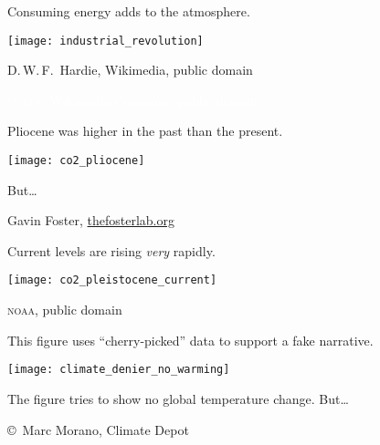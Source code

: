 \documentclass[t]{beamer}
\begin{document}
%
%

%
%
%
%
\begin{frame}[t]{Consuming energy adds  to the atmosphere.}

	\texttt{[image: industrial\_revolution]}

	\vfilll
	
	\hfill \tiny D.\,W.\,F.~Hardie, Wikimedia, public domain

\end{frame}
%
{
\begin{frame}[b]

	\hfill \tiny \textcolor{white}{\textsc{us epa}, Wikimedia Commons, public domain}
\end{frame}
}
%
\begin{frame}{Pliocene  was higher in the past than the present.}
	
	\texttt{[image: co2\_pliocene]}\par
	
	\hangpara But\dots
	
	\vfilll
	
	\hfill \tiny Gavin Foster, \href{http://www.thefosterlab.org/blog/2015/11/11/is-this-the-last-year-below-400-ppm}{thefosterlab.org}
\end{frame}
%
\begin{frame}{Current  levels are rising \emph{very} rapidly.}
	
	{\centering
		\texttt{[image: co2\_pleistocene\_current]}\par
	}
	
	\vfilll
	
	\hfill \tiny \textsc{noaa}, public domain
\end{frame}
%
\begin{frame}[t]{This figure uses “cherry-picked” data to support a fake narrative.}
	
	{\centering
		\texttt{[image: climate\_denier\_no\_warming]}\par
	}
	
	The figure tries to show no global temperature change. But\dots
	
	\vfilll
	
	\hfill \tiny \copyright~Marc Morano, Climate Depot
\end{frame}
\end{document}

